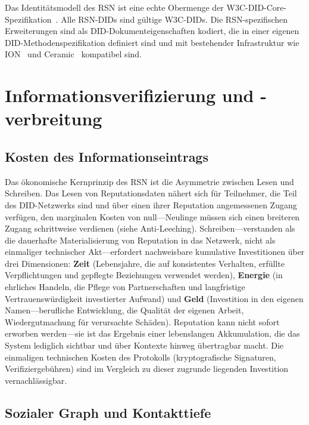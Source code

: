 \documentclass[11pt,a4paper,twocolumn]{article}
\begin{document}
Das Identitätsmodell des RSN ist eine echte Obermenge der W3C-DID-Core-Spezifikation~\cite{did2022}. Alle RSN-DIDs sind gültige W3C-DIDs. Die RSN-spezifischen Erweiterungen sind als DID-Dokumenteigenschaften kodiert, die in einer eigenen DID-Methodenspezifikation definiert sind und mit bestehender Infrastruktur wie ION~\cite{buchner2021} und Ceramic~\cite{ceramic2023} kompatibel sind.

\section{Informationsverifizierung und -verbreitung}

\subsection{Kosten des Informationseintrags}

Das ökonomische Kernprinzip des RSN ist die Asymmetrie zwischen Lesen und Schreiben. Das Lesen von Reputationsdaten nähert sich für Teilnehmer, die Teil des DID-Netzwerks sind und über einen ihrer Reputation angemessenen Zugang verfügen, den marginalen Kosten von null---Neulinge müssen sich einen breiteren Zugang schrittweise verdienen (siehe Anti-Leeching). Schreiben---verstanden als die dauerhafte Materialisierung von Reputation in das Netzwerk, nicht als einmaliger technischer Akt---erfordert nachweisbare kumulative Investitionen über drei Dimensionen: \textbf{Zeit} (Lebensjahre, die auf konsistentes Verhalten, erfüllte Verpflichtungen und gepflegte Beziehungen verwendet werden), \textbf{Energie} (in ehrliches Handeln, die Pflege von Partnerschaften und langfristige Vertrauenswürdigkeit investierter Aufwand) und \textbf{Geld} (Investition in den eigenen Namen---berufliche Entwicklung, die Qualität der eigenen Arbeit, Wiedergutmachung für verursachte Schäden). Reputation kann nicht sofort erworben werden---sie ist das Ergebnis einer lebenslangen Akkumulation, die das System lediglich sichtbar und über Kontexte hinweg übertragbar macht. Die einmaligen technischen Kosten des Protokolls (kryptografische Signaturen, Verifiziergebühren) sind im Vergleich zu dieser zugrunde liegenden Investition vernachlässigbar.

\subsection{Sozialer Graph und Kontakttiefe}
\end{document}
